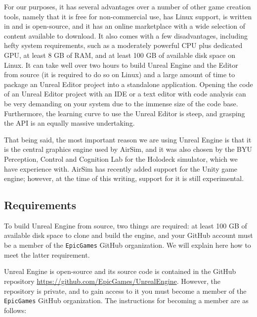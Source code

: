 For our purposes, it has several advantages over a number of other game creation tools, namely that it is free for non-commercial use, has Linux support, is written in \CC and is open-source, and it has an online marketplace with a wide selection of content available to download. It also comes with a few disadvantages, including hefty system requirements, such as a moderately powerful CPU plus dedicated GPU, at least 8 GB of RAM, and at least 100 GB of available disk space on Linux. It can take well over two hours to build Unreal Engine and the Editor from source (it is required to do so on Linux) and a large amount of time to package an Unreal Editor project into a standalone application. Opening the \CC code of an Unreal Editor project with an IDE or a text editor with code analysis can be very demanding on your system due to the immense size of the code base. Furthermore, the learning curve to use the Unreal Editor is steep, and grasping the \CC API is an equally massive undertaking.

That being said, the most important reason we are using Unreal Engine is that it is the central graphics engine used by AirSim, and it was also chosen by the BYU Perception, Control and Cognition Lab for the Holodeck simulator, which we have experience with. AirSim has recently added support for the Unity game engine; however, at the time of this writing, support for it is still experimental.

\subsection{Requirements}\label{sec:unreal_requirements}
To build Unreal Engine from source, two things are required: at least 100 GB of available disk space to clone and build the engine, and your GitHub account must be a member of the \verb|EpicGames| GitHub organization. We will explain here how to meet the latter requirement.

Unreal Engine is open-source and its source code is contained in the GitHub repository \url{https://github.com/EpicGames/UnrealEngine}. However, the repository is private, and to gain access to it you must become a member of the \verb|EpicGames| GitHub organization. The instructions for becoming a member are as follows:

